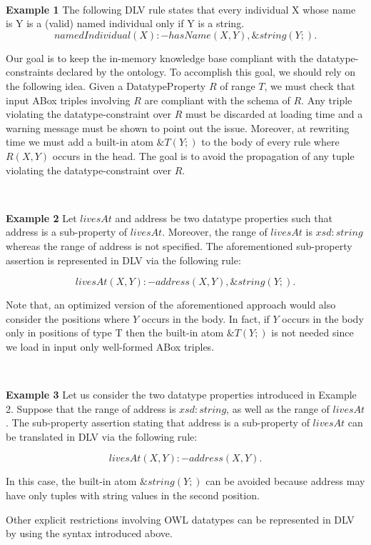 \documentclass[oneside]{book}
\begin{document}
\

\textbf{Example 1}
The following DLV rule states that every individual X whose name is Y is a (valid) named individual only if Y is a string.
\[
namedIndividual(X) :- hasName(X,Y), \&string(Y;).
\]

Our goal is to keep the in-memory knowledge base compliant with the datatype-constraints declared by the ontology. To accomplish this goal, we should rely on the following idea. Given a DatatypeProperty $R$ of range $T$, we must check that input ABox triples involving $R$ are compliant with the schema of $R$. Any triple violating the datatype-constraint over $R$ must be discarded at loading time and a warning message must be shown to point out the issue. Moreover, at rewriting time we must add a built-in atom $\&T(Y;)$ to the body of every rule where $R(X,Y)$ occurs in the head. The goal is to avoid the propagation of any tuple violating the datatype-constraint over $R$.

\

\textbf{Example 2}
Let $livesAt$ and address be two datatype properties such that address is a sub-property of $livesAt$. Moreover, the range of $livesAt$ is $xsd:string$ whereas the range of address is not specified. The aforementioned sub-property assertion is represented in DLV via the following rule:

\[
livesAt(X,Y) :- address(X,Y), \&string(Y;).
\]

Note that, an optimized version of the aforementioned approach would also consider the positions where $Y$ occurs in the body. In fact, if $Y$ occurs in the body only in positions of type T then the built-in atom $\&T(Y;)$ is not needed since we load in input only well-formed ABox triples.

\

\textbf{Example 3}
Let us consider the two datatype properties introduced in Example 2. Suppose that the range of address is $xsd:string$, as well as the range of $livesAt$. The sub-property assertion stating that address is a sub-property of $livesAt$ can be translated in DLV via the following rule:

\[
livesAt(X,Y) :- address(X,Y).
\]

In this case, the built-in atom $\&string(Y;)$ can be avoided because address may have only tuples with string values in the second position.

Other explicit restrictions involving OWL datatypes can be represented in DLV by using the syntax introduced above.
\end{document}
